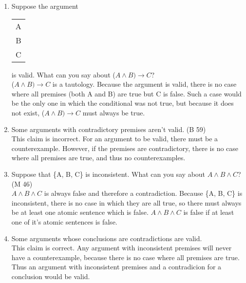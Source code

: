 \documentclass{article}
\begin{document}
\begin{enumerate}
{                  Update: it's fine, probably? See theorem-argument exchange (Theorem 1.1).}\\
            The argument is invalid. For ($A \land B) \to C$ to be contingent (and not a tautology), there must be at least one case where the conditional is false. This means there is a case where $A \land B$ is true but C is false, which would be a counterexample to the argument, rendering it invalid.
      \item Suppose the argument \begin{tabular}{c}A\\B\\\hline C\end{tabular} is valid. What can you say about ($A \land B) \to C$?\\
            ($A \land B) \to C$ is a tautology. Because the argument is valid, there is no case where all premises (both A and B) are true but C is false. Such a case would be the only one in which the conditional was not true, but because it does not exist, ($A \land B) \to C$ must always be true.
      \item Some arguments with contradictory premises aren't valid. (B 59)\\
            This claim is incorrect. For an argument to be valid, there must be a counterexample. However, if the premises are contradictory, there is no case where all premises are true, and thus no counterexamples.
      \item Suppose that \{A, B, C\} is inconsistent. What can you say about $A \land B \land C$? (M 46)\\
            $A \land B \land C$ is always false and therefore a contradiction. Because \{A, B, C\} is inconsistent, there is no case in which they are all true, so there must always be at least one atomic sentence which is false. $A \land B \land C$ is false if at least one of it's atomic sentences is false.
      \item Some arguments whose conclusions are contradictions are valid.\\
            This claim is correct. Any argument with inconsistent premises will never have a counterexample, because there is no case where all premises are true. Thus an argument with inconsistent premises and a contradicion for a conclusion would be valid.

\end{enumerate}
\end{document}
